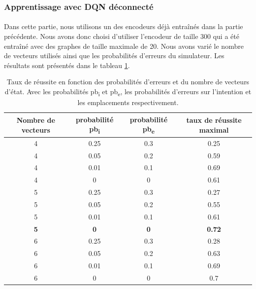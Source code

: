 \subsubsection{Apprentissage avec DQN déconnecté}
\paragraph{}Dans cette partie, nous utilisons un des encodeurs déjà entraînés dans la partie précédente. Nous avons donc choisi d'utiliser l'encodeur de taille 300 qui a été entraîné avec des graphes de taille maximale de 20. Nous avons varié le nombre de vecteurs utilisés ainsi que les probabilités d'erreurs du simulateur. Les résultats sont présentés dans le tableau \ref{table_results_dis}.
\begin{table}[H]
	\begin{center}
		
		\begin{tabular}{|c|c|c|c|}
			\hline
			\textbf{Nombre de vecteurs} & \textbf{probabilité pb\textsubscript{i}} & \textbf{probabilité pb\textsubscript{e}} & \textbf{taux de réussite maximal}\\
			\hline
			4 & 0.25 & 0.3 & 0.25\\
			\hline
			4 & 0.05 & 0.2 & 0.59\\
			\hline
			\rowcolor{LightCyan}
			4 & 0.01 & 0.1 & 0.69\\
			\hline
			4 & 0 & 0 & 0.61\\
			\hline
			5 & 0.25 & 0.3 & 0.27\\
			\hline
			5 & 0.05 & 0.2 & 0.55\\
			\hline
			5 & 0.01 & 0.1 & 0.61\\
			\hline
			\textbf{5} & \textbf{0} & \textbf{0} & \textbf{0.72}\\
			\hline
			6 & 0.25 & 0.3 & 0.28\\
			\hline
			6 & 0.05 & 0.2 & 0.63\\
			\hline
			\rowcolor{LightCyan}
			6 & 0.01 & 0.1 & 0.69\\
			\hline
			6 & 0 & 0 & 0.7\\
			\hline
		\end{tabular}
		\caption{Taux de réussite en fonction des probabilités d'erreurs et du nombre de vecteurs d'état. Avec les probabilités pb\textsubscript{i} et pb\textsubscript{e}, les probabilités d'erreurs sur l'intention et les emplacements respectivement.}\label{table_results_dis}
	\end{center}
\end{table}
